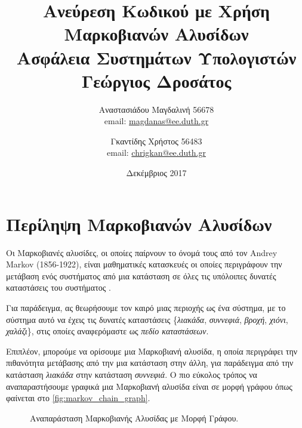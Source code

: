 \documentclass[11pt]{article}
\title{
    Ανεύρεση Κωδικού με Χρήση Μαρκοβιανών Αλυσίδων \\[20pt]
    \large Ασφάλεια Συστημάτων Υπολογιστών \\
    Γεώργιος Δροσάτος
}
\author{
    Αναστασιάδου Μαγδαλινή 56678
    \\ email: \href{mailto:magdanas@ee.duth.gr}{magdanas@ee.duth.gr}
    \and
    Γκαντίδης Χρήστος 56483 \\
    email: \href{mailto:chrigkan@ee.duth.gr}{chrigkan@ee.duth.gr}
}
\date{Δεκέμβριος 2017}
\begin{document}
\maketitle

\newpage
{}
\tableofcontents

\newpage
{}
\section{Περίληψη Μαρκοβιανών Αλυσίδων}

Οι Μαρκοβιανές αλυσίδες, οι οποίες παίρνουν το όνομά τους από τον Andrey Markov (1856-1922), είναι μαθηματικές κατασκευές οι οποίες περιγράφουν την μετάβαση ενός συστήματος από μια κατάσταση σε όλες τις υπόλοιπες δυνατές καταστάσεις του συστήματος \cite{wiki:markov_chain}.

Για παράδειγμα, ας θεωρήσουμε τον καιρό μιας περιοχής ως ένα σύστημα, με το σύστημα αυτό να έχεις τις δυνατές καταστάσεις \{\textit{λιακάδα}, \textit{συννεφιά}, \textit{βροχή}, \textit{χιόνι}, \textit{χαλάζι}\}, στις οποίες αναφερόμαστε ως \textit{πεδίο καταστάσεων}.

Επιπλέον, μπορούμε να ορίσουμε μια Μαρκοβιανή αλυσίδα, η οποία περιγράφει την πιθανότητα μετάβασης από την μια κατάσταση στην άλλη, για παράδειγμα από την κατάσταση \textit{λιακάδα} στην κατάσταση \textit{συννεφιά}. Ο πιο εύκολος τρόπος να αναπαραστήσουμε γραφικά μια Μαρκοβιανή αλυσίδα είναι σε μορφή γράφου όπως φαίνεται στο \autoref{fig:markov_chain_graph}.

\begin{figure}[h]
    \centering
    \caption{Αναπαράσταση Μαρκοβιανής Αλυσίδας με Μορφή Γράφου.\label{fig:markov_chain_graph}}
\end{figure}
\end{document}
